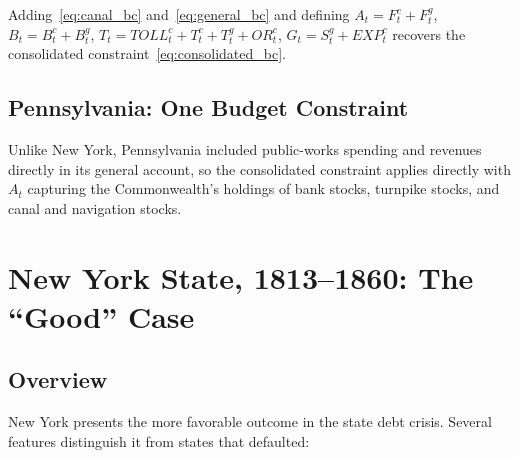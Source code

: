 \documentclass[11pt]{article}
\begin{document}
Adding~\eqref{eq:canal_bc} and~\eqref{eq:general_bc} and defining
$A_t = F^c_t + F^g_t$,\; $B_t = B^c_t + B^g_t$,\;
$T_t = TOLL^c_t + T^c_t + T^g_t + OR^c_t$,\;
$G_t = S^g_t + EXP^c_t$
recovers the consolidated constraint~\eqref{eq:consolidated_bc}.

\subsection{Pennsylvania: One Budget Constraint}

Unlike New York, Pennsylvania included public-works spending and revenues
directly in its general account, so the consolidated constraint applies directly
with $A_t$ capturing the Commonwealth's holdings of bank stocks, turnpike
stocks, and canal and navigation stocks.

\section{New York State, 1813--1860: The ``Good'' Case}
\label{sec:newyork}

\subsection{Overview}

New York presents the more favorable outcome in the state debt crisis.
Several features distinguish it from states that defaulted:
\end{document}
